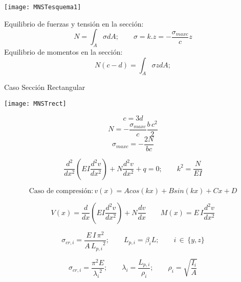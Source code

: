 \begin{center}
\end{center}

\begin{minipage}{0.32\textwidth}
	\texttt{[image: MNSTesquema1]}
\end{minipage}
\begin{minipage}{0.65\textwidth}
	\hspace{0.4cm}
	Equilibrio de fuerzas y tensión en la sección:
	$$
	N=\int_{A} \sigma dA ;
	\qquad
	\sigma= k.z= -\frac{\sigma_{maxc}}{c} z
	$$
	\hspace{0.4cm}
	Equilibrio de momentos en la sección:
	$$
	N (c-d)=\int_{A} \sigma z dA ;
	$$
\end{minipage}

\vspace{0.2cm}
Caso Sección Rectangular

\begin{minipage}{0.33\textwidth}
	\texttt{[image: MNSTrect]}
\end{minipage}
\begin{minipage}{0.66\textwidth}
	\vspace{0.4cm}
	$$
	c=3d
	$$
	\vspace{0.02cm}
	$$
	N=-\frac{\sigma_{maxc}}{c}\frac{b\, c^2}{2}
	$$
	\vspace{0.02cm}
	$$
	\sigma_{maxc}=-\frac{2N}{bc}
	$$
\end{minipage}

\vspace{0.2cm}
\begin{center}
\end{center}

$$
\frac{d^2}{dx^2}\left(EI\frac{d^2 v}{dx^2}\right) + N\frac{d^2 v}{dx^2} + q =0 ;
\qquad
k^2=\frac{N}{EI}
$$

$$
\text{Caso de compresión}: v(x)= Acos(kx) + Bsin(kx) + Cx + D
$$

$$
V(x) = \frac{d}{dx}\left(EI\frac{d^2 v}{dx^2}\right) + N\frac{dv}{dx}
\qquad
M(x) = E \, I\frac{d^2 v}{dx^2}
$$


$$
\sigma_{cr,i}=\frac{E\,I\,\pi^2}{A\, {L_{p,i}}^2} ;
\qquad
L_{p,i}=\beta_i L ;
\qquad
i \, \in \, \{y,z\}
$$

$$
\sigma_{cr,i}= \frac {\pi^2 E}{{\lambda_i}^2} ;
\qquad
\lambda_i=\frac{L_{p,i}}{\rho_i} ;
\qquad
\rho_i=\sqrt{\frac{I_i}{A}}
$$

